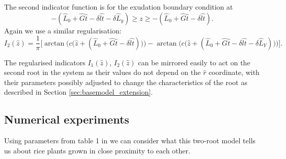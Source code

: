 \documentclass[11pt]{article}
\numberwithin{equation}{section}
\begin{document}
The second indicator function is for the exudation boundary condition at 
\[
    -(\hat L_0 + \hat G \hat t - \delta \widehat{lt} - \delta \hat L_y) \geq z \geq -(\hat L_0 + \hat G \hat t - \delta \widehat{lt}).
\]
Again we use a similar regularisation:
\begin{equation}
    I_2 (\hat z) = \frac{1}{\pi} \bigg[ \arctan\Big(c \big(\hat z + (\hat L_0 + \hat G\hat t -\delta \widehat{lt}) \big) \Big) - \arctan\big(c \big( \hat z+(\hat L_0 + \hat G \hat t - \delta \widehat{lt} - \delta \hat L_Y ) \big) \Big) \bigg].
\end{equation}

The regularised indicators $I_1(\hat z)$, $I_2(\hat z)$ can be mirrored easily to act on the second root in the system as their values do not depend on the $\hat r$ coordinate, with their parameters possibly adjusted to change the characteristics of the root as described in Section \ref{sec:basemodel_extension}.

\subsection{Numerical experiments}
Using parameters from table 1 in \cite{Ptashnyk-2011} we can consider what this two-root model tells us about rice plants grown in close proximity to each other.
\end{document}
